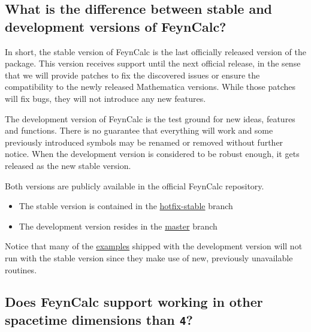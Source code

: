 \documentclass[../FeynCalcManual.tex]{subfiles}
\begin{document}
\hypertarget{what-is-the-difference-between-stable-and-development-versions-of-feyncalc}{%
\subsection{What is the difference between stable and development
versions of
FeynCalc?}\label{what-is-the-difference-between-stable-and-development-versions-of-feyncalc}}

In short, the stable version of FeynCalc is the last officially released
version of the package. This version receives support until the next
official release, in the sense that we will provide patches to fix the
discovered issues or ensure the compatibility to the newly released
Mathematica versions. While those patches will fix bugs, they will not
introduce any new features.

The development version of FeynCalc is the test ground for new ideas,
features and functions. There is no guarantee that everything will work
and some previously introduced symbols may be renamed or removed without
further notice. When the development version is considered to be robust
enough, it gets released as the new stable version.

Both versions are publicly available in the official FeynCalc
repository.

\begin{itemize}
\tightlist
\item
  The stable version is contained in the
  \href{https://github.com/FeynCalc/feyncalc/tree/hotfix-stable}{hotfix-stable}
  branch
\item
  The development version resides in the
  \href{https://github.com/FeynCalc/feyncalc/tree/master}{master} branch
\end{itemize}

Notice that many of the
\href{https://github.com/FeynCalc/feyncalc/tree/master/FeynCalc/Examples}{examples}
shipped with the development version will not run with the stable
version since they make use of new, previously unavailable routines.

\hypertarget{does-feyncalc-support-working-in-other-spacetime-dimensions-than-4}{%
\subsection{\texorpdfstring{Does FeynCalc support working in other
spacetime dimensions than
\texttt{4}?}{Does FeynCalc support working in other spacetime dimensions than ?}}\label{does-feyncalc-support-working-in-other-spacetime-dimensions-than-4}}
\end{document}
